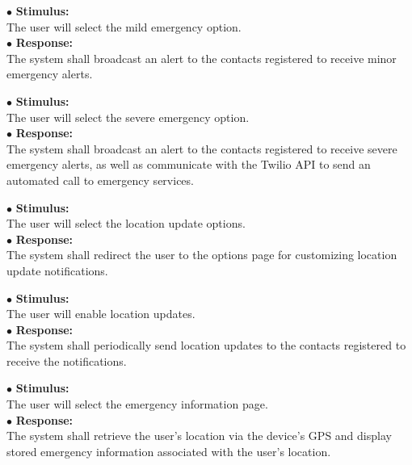 \documentclass{scrreprt}
\begin{document}
\vspace{5mm}
	\hspace{-4.75mm} $\bullet$ \textbf{Stimulus:} \\ \hspace{5mm} The user will select the mild emergency option.\\
	$\bullet$ \textbf{Response:} \\ \hspace{5mm} The system shall broadcast an alert to the contacts registered to receive minor emergency alerts.

\vspace{5mm}
	\hspace{-4.75mm} $\bullet$ \textbf{Stimulus:} \\ \hspace{5mm} The user will select the severe emergency option.\\
	$\bullet$ \textbf{Response:} \\ \hspace{5mm} The system shall broadcast an alert to the contacts registered to receive severe emergency alerts, as well as communicate with the Twilio API to send an automated call to emergency services.

\vspace{5mm}
	\hspace{-4.75mm} $\bullet$ \textbf{Stimulus:} \\ \hspace{5mm} The user will select the location update options.\\
	$\bullet$ \textbf{Response:} \\ \hspace{5mm} The system shall redirect the user to the options page for customizing location update notifications.

\vspace{5mm}
	\hspace{-4.75mm} $\bullet$ \textbf{Stimulus:} \\ \hspace{5mm} The user will enable location updates.\\
	$\bullet$ \textbf{Response:} \\ \hspace{5mm} The system shall periodically send location updates to the contacts registered to receive the notifications.
\newpage

\vspace{5mm}
	\hspace{-4.75mm} $\bullet$ \textbf{Stimulus:} \\ \hspace{5mm} The user will select the emergency information page.\\
	$\bullet$ \textbf{Response:} \\ \hspace{5mm} The system shall retrieve the user's location via the device's GPS and display stored emergency information associated with the user's location.
\end{document}
